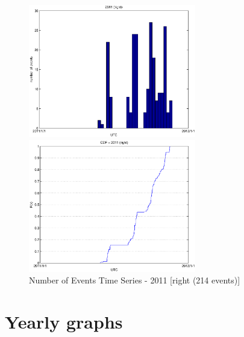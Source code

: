 \documentclass[a4paper,11pt]{article}
\begin{document}
\begin{figure}[htbp]
\begin{minipage}{0.55\hsize}
\centering
\includegraphics[width=7.3cm, clip]{histTime2011R.eps}
\end{minipage}
\begin{minipage}{0.55\hsize}
 \centering
\includegraphics[width=7.3cm, clip]{CDFTime2011R.eps}
\end{minipage}
\caption{Number of Events Time Series - 2011 [right (214 events)]}
\end{figure}

\newpage

\section{Yearly graphs}
\end{document}

